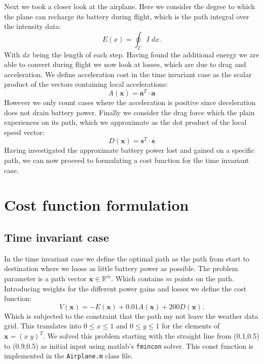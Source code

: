 \documentclass[ twoside,openright,titlepage,numbers=noenddot,headinclude,%
                footinclude=true,cleardoublepage=empty,abstractoff, %
                BCOR=5mm,paper=a4,fontsize=11pt,%
                ngerman,american,%
                ]{scrreprt}
\begin{document}
Next we took a closer look at the airplane. Here we consider the degree to which the plane can recharge its battery during flight, which is the path integral over the intensity data:
\begin{equation} \label{eqn:sunNotime}
E(x) = \oint_{\Gamma} I  \; dx.
\end{equation}
With $dx$ being the length of each step. Having found the additional energy we are able to convert during flight we now look at losses, which are due to drag and acceleration. We define acceleration cost in the time invariant case as the scalar product of the vectors containing local accelerations:
\begin{equation}
A(\mathbf{x}) = \mathbf{a}^T \cdot \mathbf{a}
\end{equation}
 However we only count cases where the acceleration is positive since deceleration does not drain battery power.
Finally we consider the drag force which the plain experiences on its path, which we approximate as the dot product of the local speed vector:
\begin{equation}
D(\mathbf{x}) = \mathbf{s}^T \cdot \mathbf{s}
\end{equation}
Having investigated the approximate battery power lost and gained on a specific path, we can now proceed to formulating a cost function for the time invariant case.

\section{Cost function formulation}
\subsection{Time invariant case}
In the time invariant case we define the optimal path as the path from start to destination where we loose as little battery power as possible. The problem parameter is a path vector $\mathbf{x} \in \mathbb{R}^m$. Which contains $m$ points on the path. Introducing weights for the different power gains and losses we define the cost function:
\begin{equation}
V(\mathbf{x}) = - E(\mathbf{x}) +0.01A(\mathbf{x}) + 200D(\mathbf{x}).
\end{equation}
Which is subjected to the constraint that the path my not leave the weather data grid. This translates into $0 \leq x \leq 1$ and $0 \leq y \leq 1$ for the elements of $\mathbf{x} = (x \; y)^T$. We solved this problem starting with the straight line from (0.1,0.5) to (0.9,0.5) as initial input using matlab's \texttt{fmincon} solver. This const function is implemented in the \texttt{Airplane.m} class file.
\end{document}
